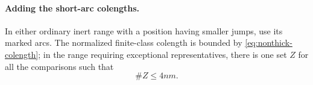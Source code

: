 





\paragraph{Adding the short-arc colengths.}
\begin{lemma}
\label{lem:ordinary-inert-short-cuts}
In either ordinary inert range with a position having smaller jumps, use its
marked arcs. The normalized finite-class colength is bounded by
\eqref{eq:nonthick-colength}; in the range requiring exceptional representatives, there is one set \(Z\) for all the comparisons such that
\[
 \#Z\le4nm.
\]
\end{lemma}

